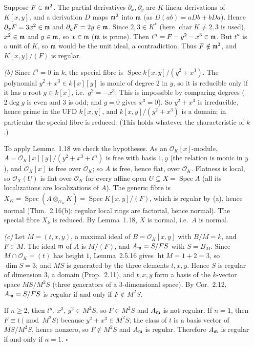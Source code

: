 \documentclass[11pt]{article}
\begin{document}
Suppose $F\in\mathfrak m^2$. The partial derivatives $\partial_x,\partial_y$ are $K$-linear derivations of $K[x,y]$, and a derivation $D$ maps $\mathfrak m^2$ into $\mathfrak m$ (as $D(ab)=aDb+bDa$). Hence $\partial_xF=3x^2\in\mathfrak m$ and $\partial_yF=2y\in\mathfrak m$. Since $2,3\in K^*$ (here $\operatorname{char}K\ne2,3$ is used), $x^2\in\mathfrak m$ and $y\in\mathfrak m$, so $x\in\mathfrak m$ ($\mathfrak m$ is prime). Then $t^n=F-y^2-x^3\in\mathfrak m$. But $t^n$ is a unit of $K$, so $\mathfrak m$ would be the unit ideal, a contradiction. Thus $F\notin\mathfrak m^2$, and $K[x,y]/(F)$ is regular.

\emph{(b)} Since $t^n=0$ in $k$, the special fibre is $\operatorname{Spec}k[x,y]/(y^2+x^3)$. The polynomial $y^2+x^3\in k[x][y]$ is monic of degree $2$ in $y$, so it is reducible only if it has a root $g\in k[x]$, i.e.\ $g^2=-x^3$. This is impossible by comparing degrees ($2\deg g$ is even and $3$ is odd; and $g=0$ gives $x^3=0$). So $y^2+x^3$ is irreducible, hence prime in the UFD $k[x,y]$, and $k[x,y]/(y^2+x^3)$ is a domain; in particular the special fibre is reduced. (This holds whatever the characteristic of $k$.)

To apply Lemma~1.18 we check the hypotheses. As an $\mathcal O_K[x]$-module, $A=\mathcal O_K[x][y]/(y^2+x^3+t^n)$ is free with basis $1,y$ (the relation is monic in $y$), and $\mathcal O_K[x]$ is free over $\mathcal O_K$; so $A$ is free, hence flat, over $\mathcal O_K$. Flatness is local, so $\mathcal O_X(U)$ is flat over $\mathcal O_K$ for every affine open $U\subseteq X=\operatorname{Spec}A$ (all its localizations are localizations of $A$). The generic fibre is $X_K=\operatorname{Spec}(A\otimes_{\mathcal O_K}K)=\operatorname{Spec}K[x,y]/(F)$, which is regular by (a), hence normal (Thm.~2.16(b): regular local rings are factorial, hence normal). The special fibre $X_k$ is reduced. By Lemma~1.18, $X$ is normal, i.e.\ $A$ is normal.

\emph{(c)} Let $M=(t,x,y)$, a maximal ideal of $B=\mathcal O_K[x,y]$ with $B/M=k$, and $F\in M$. The ideal $\mathfrak m$ of $A$ is $M/(F)$, and $A_\mathfrak m=S/FS$ with $S=B_M$. Since $M\cap\mathcal O_K=(t)$ has height $1$, Lemma~2.5.16 gives $\operatorname{ht}M=1+2=3$, so $\dim S=3$; and $MS$ is generated by the three elements $t,x,y$. Hence $S$ is regular of dimension $3$, a domain (Prop.~2.11), and $t,x,y$ form a basis of the $k$-vector space $MS/M^2S$ (three generators of a $3$-dimensional space). By Cor.~2.12, $A_\mathfrak m=S/FS$ is regular if and only if $F\notin M^2S$.

If $n\ge2$, then $t^n,\,x^3,\,y^2\in M^2S$, so $F\in M^2S$ and $A_\mathfrak m$ is not regular. If $n=1$, then $F\equiv t\pmod{M^2S}$ because $y^2+x^3\in M^2S$; the class of $t$ is a basis vector of $MS/M^2S$, hence nonzero, so $F\notin M^2S$ and $A_\mathfrak m$ is regular. Therefore $A_\mathfrak m$ is regular if and only if $n=1$. \hfill$\square$
\end{document}
